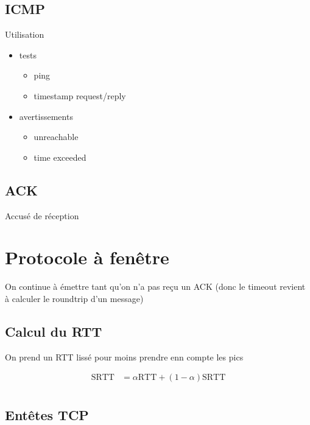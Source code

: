 \documentclass{article}
\begin{document}
\subsection{ICMP}
Utilisation
\begin{itemize}
    \item tests
        \begin{itemize}
    \item ping
    \item timestamp request/reply
        \end{itemize}
    \item avertissements
        \begin{itemize}
            \item unreachable
            \item time exceeded
        \end{itemize}
\end{itemize}

\subsection{ACK}
Accusé de réception


\section{Protocole à fenêtre}

On continue à émettre tant qu'on n'a pas reçu un ACK (donc le timeout revient à calculer le roundtrip d'un message)

\subsection{Calcul du RTT}

On prend un RTT lissé pour moins prendre enn compte les pics

\begin{align*}
    \text{SRTT} &= \alpha \text{RTT} + (1-\alpha) \text{SRTT} \\
\end{align*}

\subsection{Entêtes TCP}
\end{document}
